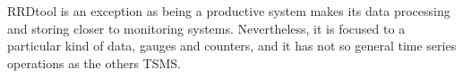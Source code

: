 RRDtool is an exception as being a productive system makes its data processing and storing closer to monitoring systems. Nevertheless, it is focused to a particular kind of data, gauges and counters, and it has not so general time series operations as the others TSMS.









